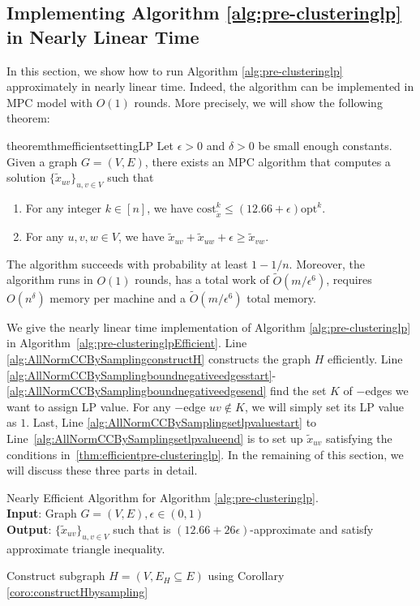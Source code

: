 \documentclass[11pt]{article}
\newcommand{\cost}{\mathrm{cost}}
\newcommand{\opt}{{\mathrm{opt}}}
\begin{document}
\begin{CJK*}{UTF8}{gbsn}
 
\section{Implementing Algorithm \ref{alg:pre-clusteringlp} in Nearly Linear Time}
\label{sec:nearly-linear}
In this section, we show how to run Algorithm \ref{alg:pre-clusteringlp} approximately in nearly linear time. Indeed, the algorithm can be implemented in MPC model with $O(1)$ rounds. More precisely, we will show the following theorem:

\begin{restatable}{theorem}{thmefficientsettingLP} \label{thm:efficientpre-clusteringlp}
Let $\epsilon> 0$ and $\delta > 0$ be small enough constants. Given a graph  $G = (V, E)$, there exists an MPC algorithm that computes a solution $\{ \tilde{x}_{uv} \}_{u,v \in V}$ such that 
\begin{enumerate}
    \item For any integer $k \in [n]$, we have $\cost^k_{\tilde{x}} \leq (12.66+ \epsilon) \opt^k$.
    \item  For any $u,v,w \in V$, we have $\tilde{x}_{uv} + \tilde{x}_{uw} + \epsilon \geq \tilde{x}_{vw}$. 
\end{enumerate}
The algorithm succeeds with probability at least $1 - 1/n$. Moreover,  the algorithm runs in $O(1)$ rounds, has a total work of $\tilde{O}(m / \epsilon^6)$, requires $O(n^\delta)$ memory per machine and a $\tilde{O}(m / \epsilon^6)$ total memory. 
\end{restatable}






We give the nearly linear time implementation of Algorithm \ref{alg:pre-clusteringlp} in Algorithm~\ref{alg:pre-clusteringlpEfficient}. Line \ref{alg:AllNormCCBySamplingconstructH} constructs the graph $H$ efficiently. Line \ref{alg:AllNormCCBySamplingboundnegativeedgesstart}-\ref{alg:AllNormCCBySamplingboundnegativeedgesend} find the set $K$ of $-$edges we want to assign LP value. For any $-$edge $uv \not\in K$, we will simply set its LP value as $1$. Last, Line \ref{alg:AllNormCCBySamplingsetlpvaluestart} to Line~\ref{alg:AllNormCCBySamplingsetlpvalueend} is to set up $\tilde{x}_{uv}$ satisfying the conditions in~\ref{thm:efficientpre-clusteringlp}. In the remaining of this section, we will discuss these three parts in detail.

\begin{algorithm}[ht!]
\caption{Nearly Efficient Algorithm for Algorithm \ref{alg:pre-clusteringlp}.\\
\textbf{Input}: Graph $G = (V, E), \epsilon\in (0, 1)$\\
\textbf{Output}: $\{ \tilde{x}_{uv} \}_{u,v \in V}$ such that is $(12.66 + 26\epsilon)$-approximate and satisfy approximate triangle inequality. }
\label{alg:pre-clusteringlpEfficient}
\begin{algorithmic}[1]
    \State Construct subgraph $H = (V, E_H \subseteq E)$ using Corollary \ref{coro:constructHbysampling} 
    \label{alg:AllNormCCBySamplingconstructH} \medskip



\end{algorithmic}
\end{algorithm}
\end{CJK*}
\end{document}
